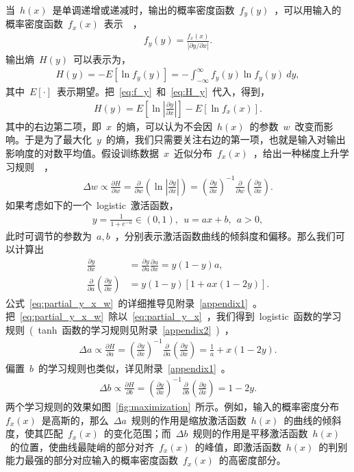 \documentclass[UTF8,a4paper,12pt]{ctexart}
\numberwithin{equation}{section}
\numberwithin{figure}{section}
\numberwithin{table}{section}
\begin{document}
当~$h(x)$~是单调递增或递减时，输出的概率密度函数~$f_y(y)$~，可以用输入的概率密度函数~$f_x(x)$~表示~\cite{papoulis2002probability}~，
\begin{align}
f_y(y)=\frac{f_x(x)}{|\partial y / \partial x|}. \label{eq:f_y}
\end{align}
输出熵~$H(y)$~可以表示为，
\begin{align}
H(y)=-E[\ln f_y(y)]=-\int_{-\infty}^{\infty} f_y(y) \ln f_y(y)~dy, \label{eq:H_y}
\end{align}
其中~$E[\cdot]$~表示期望。把~\eqref{eq:f_y}~和~\eqref{eq:H_y}~代入，得到，
\begin{align}
H(y)=E\left[ \ln\left| \frac{\partial y}{\partial x} \right| \right] - E[\ln f_x(x)].
\end{align}
其中的右边第二项，即~$x$~的熵，可以认为不会因~$h(x)$~的参数~$w$~改变而影响。于是为了最大化~$y$~的熵，我们只需要关注右边的第一项，也就是输入对输出影响度的对数平均值。假设训练数据~$x$~近似分布~$f_x(x)$~，给出一种梯度上升学习规则~\cite{bell1995information}~，
\begin{align}
\Delta w \varpropto \frac{\partial H}{\partial w} = \frac{\partial }{\partial w} \left( \ln \left| \frac{\partial y}{\partial x} \right| \right) = \left( \frac{\partial y}{\partial x} \right)^{-1} \frac{\partial }{\partial w} \left( \frac{\partial y}{\partial x} \right).
\end{align}
如果考虑如下的一个~logistic~激活函数，
\begin{align}
y = \frac{1}{1 + e^{-u}} \in (0,1),~~u=ax + b,~~a>0,
\end{align}
此时可调节的参数为~$a,b$~，分别表示激活函数曲线的倾斜度和偏移。那么我们可以计算出
\begin{align}
\frac{\partial y}{\partial x} &= \frac{\partial y}{\partial u} \frac{\partial u}{\partial x} = y(1-y)a, \label{eq:partial_y_x} \\
\frac{\partial}{\partial a} \left( \frac{\partial y}{\partial x} \right) &= y(1-y)[1+ax(1-2y)]. \label{eq:partial_y_x_w}
\end{align}
公式~\eqref{eq:partial_y_x_w}~的详细推导见附录~\ref{appendix1}~。把~\eqref{eq:partial_y_x_w}~除以~\eqref{eq:partial_y_x}~，我们得到~logistic~函数的学习规则~(~tanh~函数的学习规则见附录~\ref{appendix2}~)~，
\begin{align}
\Delta a \varpropto \frac{\partial H}{\partial a} = \left( \frac{\partial y}{\partial x} \right)^{-1} \frac{\partial }{\partial a} \left( \frac{\partial y}{\partial x} \right) = \frac{1}{a} + x(1-2y).
\end{align}
偏置~$b$~的学习规则也类似，详见附录~\ref{appendix1}~。
\begin{align}
\Delta b \varpropto \frac{\partial H}{\partial b} = \left( \frac{\partial y}{\partial x} \right)^{-1} \frac{\partial }{\partial b} \left( \frac{\partial y}{\partial x} \right) = 1-2y.
\end{align}
两个学习规则的效果如图~\ref{fig:maximization}~所示。例如，输入的概率密度分布~$f_x(x)$~是高斯的，那么~$\Delta a$~规则的作用是缩放激活函数~$h(x)$~的曲线的倾斜度，使其匹配~$f_x(x)$~的变化范围；而~$\Delta b$~规则的作用是平移激活函数~$h(x)$~的位置，使曲线最陡峭的部分对齐~$f_x(x)$~的峰值，即激活函数~$h(x)$~的判别能力最强的部分对应输入的概率密度函数~$f_x(x)$~的高密度部分。
\end{document}
